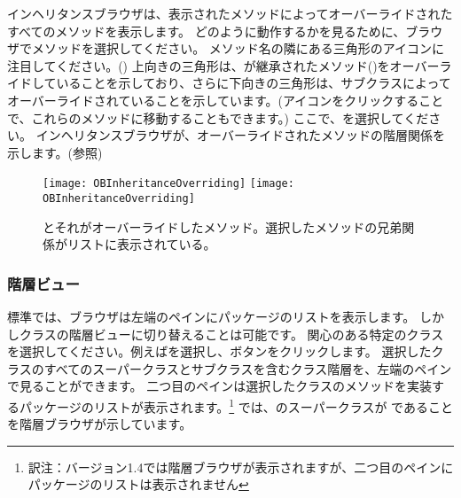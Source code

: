 \documentclass[a4paper,10pt,twoside]{book}
\begin{document}
インヘリタンスブラウザは、表示されたメソッドによってオーバーライドされたすべてのメソッドを表示します。
どのように動作するかを見るために、ブラウザでメソッドを選択してください。
メソッド名の隣にある三角形のアイコンに注目してください。()
上向きの三角形は、が継承されたメソッド(\ie {})をオーバーライドしていることを示しており、さらに下向きの三角形は、サブクラスによってオーバーライドされていることを示しています。(アイコンをクリックすることで、これらのメソッドに移動することもできます。)
ここで、を選択してください。
インヘリタンスブラウザが、オーバーライドされたメソッドの階層関係を示します。(参照)

\begin{figure}[btp]
\begin{center}
   \ifluluelse
{\texttt{[image: OBInheritanceOverriding]}}
{\texttt{[image: OBInheritanceOverriding]}}
\end{center}
\caption{ とそれがオーバーライドしたメソッド。選択したメソッドの兄弟関係がリストに表示されている。}
\end{figure}

\subsubsection{階層ビュー}

標準では、ブラウザは左端のペインにパッケージのリストを表示します。
しかしクラスの階層ビューに切り替えることは可能です。
関心のある特定のクラスを選択してください。例えばを選択し、ボタンをクリックします。
選択したクラスのすべてのスーパークラスとサブクラスを含むクラス階層を、左端のペインで見ることができます。
二つ目のペインは選択したクラスのメソッドを実装するパッケージのリストが表示されます。\footnote{訳注：バージョン1.4では階層ブラウザが表示されますが、二つ目のペインにパッケージのリストは表示されません}
では、のスーパークラスが であることを階層ブラウザが示しています。
\end{document}
